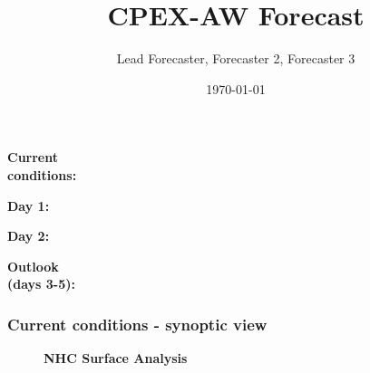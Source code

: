 \documentclass[aspectratio=169, 10pt]{beamer}
\title{CPEX-AW Forecast \vspace{-1cm}}
\author{Lead Forecaster, Forecaster 2, Forecaster 3\vspace{-1cm}}
\date{{\AdvanceDate[0]\today}\vspace{-1cm}}
\begin{document}
\begin{frame}
\vspace{-3cm}
\titlepage

\vspace{-.2cm}
\textbf{Current \\conditions:}

\vspace{.5cm}
\textbf{Day 1:}

\vspace{.5cm}
\textbf{Day 2:}

\vspace{.5cm}
\textbf{Outlook \\(days 3-5):}

\vspace{-1.5cm}
\end{frame}

\begin{frame}
\vspace{-1cm}
\frametitle{Current conditions - synoptic view}

\begin{figure} [htbp]
\begin{center}
\vspace{.6cm}
\textbf{NHC Surface Analysis}

\end{center}
\end{figure}

\end{frame}
\end{document}
